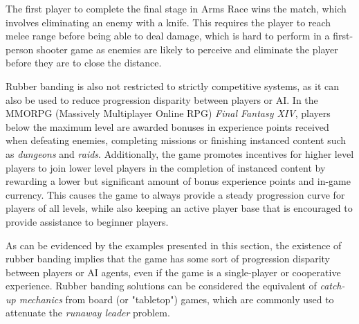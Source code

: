 The first player to complete the final stage in Arms Race wins the match, which involves eliminating an enemy with a knife. This requires the player to reach melee range before being able to deal damage, which is hard to perform in a first-person shooter game as enemies are likely to perceive and eliminate the player before they are to close the distance.

Rubber banding is also not restricted to strictly competitive systems, as it can also be used to reduce progression disparity between players or AI. In the MMORPG (Massively Multiplayer Online RPG) \emph{Final Fantasy XIV}, players below the maximum level are awarded bonuses in experience points received when defeating enemies, completing missions or finishing instanced content such as \emph{dungeons} and \emph{raids}. Additionally, the game promotes incentives for higher level players to join lower level players in the completion of instanced content by rewarding a lower but significant amount of bonus experience points and in-game currency. This causes the game to always provide a steady progression curve for players of all levels, while also keeping an active player base that is encouraged to provide assistance to beginner players.

As can be evidenced by the examples presented in this section, the existence of rubber banding implies that the game has some sort of progression disparity between players or AI agents, even if the game is a single-player or cooperative experience. Rubber banding solutions can be considered the equivalent of \emph{catch-up mechanics} from board (or "tabletop") games, which are commonly used to attenuate the \emph{runaway leader} problem.

